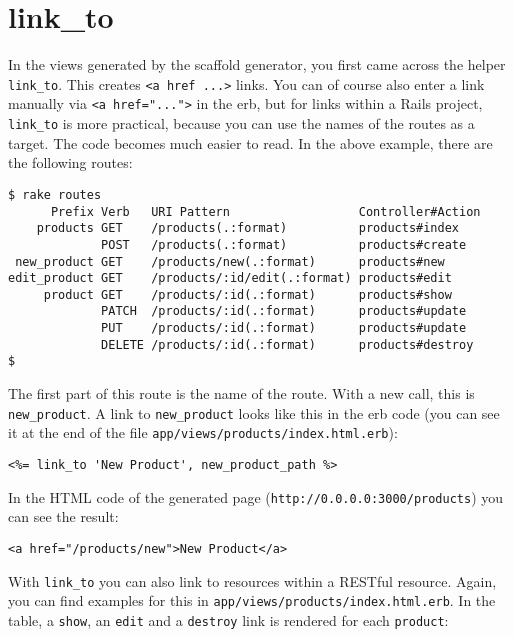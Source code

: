 \documentclass[a4paper]{book}
\newcounter{tab}[chapter]
\newcommand{\chap}[1]{\newpage\thispagestyle{empty}\chapter{#1}\label{chap:\thechapter}}
\begin{document}
\chap{link\_to}\label{linkux5fto}

In the views generated by the scaffold generator, you first came across the helper \texttt{link\_to}. This creates \texttt{\textless{}a href         ...\textgreater{}} links. You can of course also enter a link manually via \texttt{\textless{}a href="..."\textgreater{}} in the erb, but for links within a Rails project, \texttt{link\_to} is more practical, because you can use the names of the routes as a target. The code becomes much easier to read. In the above example, there are the following routes:

\begin{shaded}\begin{verbatim}
$ rake routes
      Prefix Verb   URI Pattern                  Controller#Action
    products GET    /products(.:format)          products#index
             POST   /products(.:format)          products#create
 new_product GET    /products/new(.:format)      products#new
edit_product GET    /products/:id/edit(.:format) products#edit
     product GET    /products/:id(.:format)      products#show
             PATCH  /products/:id(.:format)      products#update
             PUT    /products/:id(.:format)      products#update
             DELETE /products/:id(.:format)      products#destroy
$
\end{verbatim}\end{shaded}

The first part of this route is the name of the route. With a new call, this is \texttt{new\_product}. A link to \texttt{new\_product} looks like this in the erb code (you can see it at the end of the file \texttt{app/views/products/index.html.erb}):

\begin{shaded}\begin{verbatim}
<%= link_to 'New Product', new_product_path %>
\end{verbatim}\end{shaded}

In the HTML code of the generated page (\texttt{http://0.0.0.0:3000/products}) you can see the result:

\begin{shaded}\begin{verbatim}
<a href="/products/new">New Product</a>
\end{verbatim}\end{shaded}

With \texttt{link\_to} you can also link to resources within a RESTful resource. Again, you can find examples for this in \texttt{app/views/products/index.html.erb}. In the table, a \texttt{show}, an \texttt{edit} and a \texttt{destroy} link is rendered for each \texttt{product}:
\end{document}
